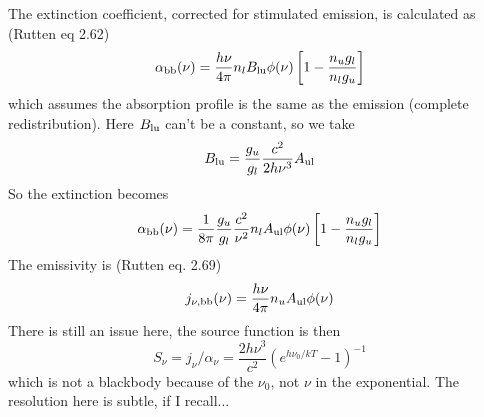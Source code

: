 \documentclass[11pt,letterpaper]{article}
\begin{document}
The extinction coefficient, corrected for stimulated emission, is calculated as (Rutten eq 2.62)
\begin{equation}
\alpha_{\rm bb}(\nu) = \frac{h \nu}{4 \pi} n_l B_{\rm lu}  \phi(\nu) \left[ 1 - \frac{n_u g_l}{n_l g_u} \right]
\end{equation}
which assumes the absorption profile is the same as the emission (complete redistribution).
Here $B_{\rm lu}$ can't be a constant, so we take
\begin{equation}
B_{\rm lu} = \frac{g_u}{g_l} \frac{c^2}{2 h \nu^3} A_{\rm ul}
\end{equation}
So the extinction becomes
\begin{equation}
\alpha_{\rm bb}(\nu) =  \frac{1}{8 \pi}  \frac{g_u}{g_l} \frac{c^2}{\nu^2} n_l A_{\rm ul}  \phi(\nu) \left[ 1 - \frac{n_u g_l}{n_l g_u} \right]
\end{equation}
The emissivity is (Rutten eq. 2.69)
\begin{equation}
j_{\rm \nu, bb}(\nu) = \frac{h \nu}{4 \pi} n_u A_{\rm ul} \phi(\nu)
\end{equation}
There is still an issue here, the source function is then
\begin{equation}
S_\nu = j_\nu/\alpha_\nu = \frac{2 h \nu^3}{c^2} (e^{h \nu_0/kT} - 1)^{-1}
\end{equation}
which is not a blackbody because of the $\nu_0$, not $\nu$ in the exponential.  The resolution here is subtle, if I recall...
\end{document}
